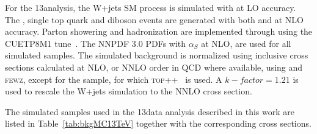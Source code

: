For the 13\TeV analysis, the W+jets SM process is simulated with \amcatnlo{} at LO accuracy.
The \ttbar, single top quark and diboson events are generated with both \POWHEG{} and \amcatnlo{} at NLO accuracy.
Parton showering and hadronization are implemented through  using the CUETP8M1 tune~\cite{Skands:2014pea,Khachatryan:2015pea}.
The NNPDF 3.0 PDFs with $\alpha_S$ at NLO, are used for all simulated samples. 
The simulated background is normalized using inclusive cross sections calculated at NLO, or NNLO order in QCD where available, using \MCFM{} and \textsc{fewz},
except for the \ttbar sample, for which \textsc{top++}~\cite{Czakon:2011xx} is used.
A $k-factor = 1.21$ is used to rescale the W+jets simulation to the NNLO cross section.

The simulated samples used in the 13\TeV data analysis described in this work are listed in Table~\ref{tab:bkgMC13TeV} together with the corresponding cross sections.

